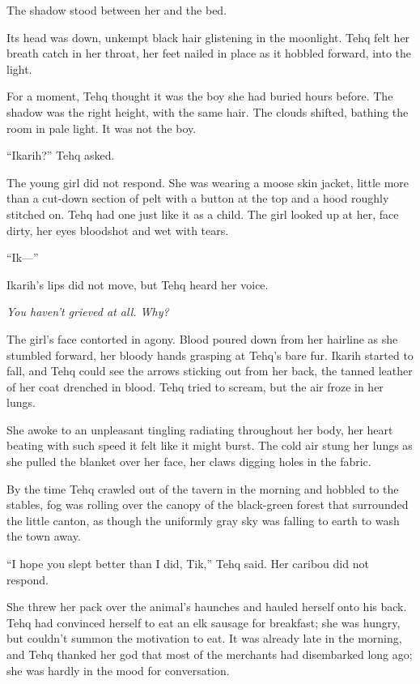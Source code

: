 The shadow stood between her and the bed.

Its head was down, unkempt black hair glistening in the moonlight. Tehq felt her breath catch in her throat, her feet nailed in place as it hobbled forward, into the light.

For a moment, Tehq thought it was the boy she had buried hours before. The shadow was the right height, with the same hair. The clouds shifted, bathing the room in pale light. It was not the boy.

``Ikarih?'' Tehq asked.

The young girl did not respond. She was wearing a moose skin jacket, little more than a cut-down section of pelt with a button at the top and a hood roughly stitched on. Tehq had one just like it as a child. The girl looked up at her, face dirty, her eyes bloodshot and wet with tears.

``Ik---''

Ikarih's lips did not move, but Tehq heard her voice.

\emph{You haven't grieved at all. Why?}

The girl's face contorted in agony. Blood poured down from her hairline as she stumbled forward, her bloody hands grasping at Tehq's bare fur. Ikarih started to fall, and Tehq could see the arrows sticking out from her back, the tanned leather of her coat drenched in blood. Tehq tried to scream, but the air froze in her lungs.

She awoke to an unpleasant tingling radiating throughout her body, her heart beating with such speed it felt like it might burst. The cold air stung her lungs as she pulled the blanket over her face, her claws digging holes in the fabric.

By the time Tehq crawled out of the tavern in the morning and hobbled to the stables, fog was rolling over the canopy of the black-green forest that surrounded the little canton, as though the uniformly gray sky was falling to earth to wash the town away.

``I hope you slept better than I did, Tik,'' Tehq said. Her caribou did not respond.

She threw her pack over the animal's haunches and hauled herself onto his back. Tehq had convinced herself to eat an elk sausage for breakfast; she was hungry, but couldn't summon the motivation to eat. It was already late in the morning, and Tehq thanked her god that most of the merchants had disembarked long ago; she was hardly in the mood for conversation.

